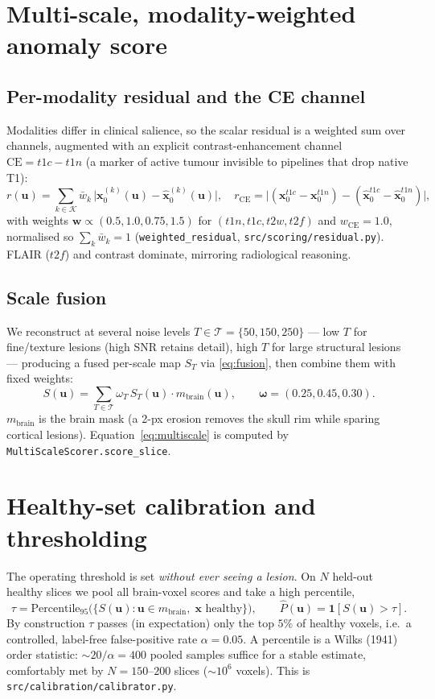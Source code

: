 \documentclass[12pt,a4paper]{article}
\newcommand{\x}{\bm{x}}
\begin{document}
\section{Multi-scale, modality-weighted anomaly score}
\subsection{Per-modality residual and the CE channel}
Modalities differ in clinical salience, so the scalar residual is a weighted sum
over channels, augmented with an explicit contrast-enhancement channel
$\mathrm{CE}=t1c-t1n$ (a marker of active tumour invisible to pipelines that drop
native T1):
\begin{equation}
r(\bm u)=\sum_{k\in\mathcal K}\bar w_k\,\big|\x_0^{(k)}(\bm u)-\hat{\x}_0^{(k)}(\bm u)\big|,
\quad
r_{\mathrm{CE}}=\big|(\x_0^{t1c}-\x_0^{t1n})-(\hat{\x}_0^{t1c}-\hat{\x}_0^{t1n})\big|,
\label{eq:residual}
\end{equation}
with weights $\bm w\propto(0.5,1.0,0.75,1.5)$ for $(t1n,t1c,t2w,t2f)$ and
$w_{\mathrm{CE}}=1.0$, normalised so $\sum_k\bar w_k=1$
(\texttt{weighted\_residual}, \texttt{src/scoring/residual.py}). FLAIR ($t2f$) and
contrast dominate, mirroring radiological reasoning.

\subsection{Scale fusion}
We reconstruct at several noise levels $T\in\mathcal T=\{50,150,250\}$ ---
low $T$ for fine/texture lesions (high SNR retains detail), high $T$ for large
structural lesions --- producing a fused per-scale map $S_T$ via
\eqref{eq:fusion}, then combine them with fixed weights:
\begin{equation}
\boxed{\;S(\bm u)=\sum_{T\in\mathcal T}\omega_T\,S_T(\bm u)\cdot m_{\text{brain}}(\bm u),
\qquad \bm\omega=(0.25,0.45,0.30).\;}
\label{eq:multiscale}
\end{equation}
$m_{\text{brain}}$ is the brain mask (a 2-px erosion removes the skull rim while
sparing cortical lesions). Equation~\eqref{eq:multiscale} is computed by
\texttt{MultiScaleScorer.score\_slice}.

\section{Healthy-set calibration and thresholding}
The operating threshold is set \emph{without ever seeing a lesion}. On $N$
held-out healthy slices we pool all brain-voxel scores and take a high
percentile,
\begin{equation}
\tau=\mathrm{Percentile}_{95}\big(\{S(\bm u):\bm u\in m_{\text{brain}},\;\x\text{ healthy}\}\big),
\qquad \hat P(\bm u)=\mathbf 1\!\left[S(\bm u)>\tau\right].
\label{eq:tau}
\end{equation}
By construction $\tau$ passes (in expectation) only the top $5\%$ of healthy
voxels, i.e.\ a controlled, label-free false-positive rate $\alpha=0.05$. A
percentile is a Wilks (1941) order statistic: $\sim20/\alpha=400$ pooled samples
suffice for a stable estimate, comfortably met by $N=150$--$200$ slices
($\sim10^6$ voxels). This is \texttt{src/calibration/calibrator.py}.
\end{document}
